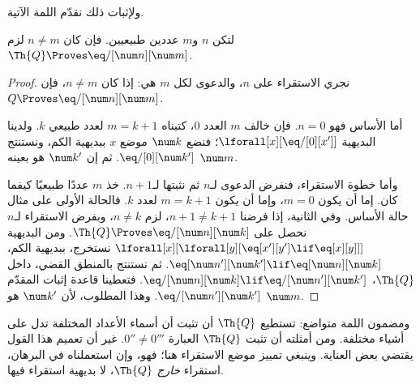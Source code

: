 \documentclass[../../../include/open-logic-section]{subfiles}
\begin{document}
ولإثبات ذلك نقدّم اللمة الآتية.

\begin{lem}
 لتكن $n$ و$m$ عددين طبيعيين.
فإن كان $n\neq m$ لزم $\Th{Q}\Proves\eq/[\num n][\num m]$.
\end{lem}

\begin{proof}
نجري الاستقراء على $n$، والدعوى لكل $m$ هي: إذا كان $n\neq m$،
فإن $Q\Proves\eq/[\num n][\num m]$.

أما الأساس فهو $n=0$. فإن خالف $m$ العدد $0$، كتبناه
$m=k+1$ لعدد طبيعي $k$. ولدينا البديهية
$\lforall[x][\eq/[0][x']]$؛ فنضع $\num k$ موضع $x$ ببديهية الكم،
ونستنتج $\eq/[0][\num k']$. ثم إن $\num k'$ هو بعينه $\num m$.

وأما خطوة الاستقراء، فنفرض الدعوى لـ$n$ ثم نثبتها لـ$n+1$.
خذ $m$ عددًا طبيعيًا كيفما كان. إما أن يكون $m=0$، وإما أن يكون
$m=k+1$ لعدد $k$. فالحالة الأولى على مثال حالة الأساس.
وفي الثانية، إذا فرضنا $n+1\neq k+1$، لزم $n\neq k$،
وبفرض الاستقراء لـ$n$ نحصل على
$\Th{Q}\Proves\eq/[\num n][\num k]$. ومن البديهية
$\lforall[x][\lforall[y][\eq[x'][y']\lif\eq[x][y]]]$
نستخرج، ببديهية الكم،
$\eq[\num n'][\num k']\lif\eq[\num n][\num k]$.
ثم نستنتج بالمنطق القضي، داخل $\Th{Q}$،
$\eq/[\num n][\num k]\lif\eq/[\num n'][\num k']$.
فتعطينا قاعدة إثبات المقدّم $\eq/[\num n'][\num k']$.
وهذا المطلوب، لأن $\num k'$ هو $\num m$.
\end{proof}

\begin{explain}
ومضمون اللمة متواضع: تستطيع $\Th{Q}$ أن تثبت أن أسماء الأعداد المختلفة
تدل على أشياء مختلفة. ومن أمثلته أن تثبت $\Th{Q}$ العبارة
$0''\neq0'''$. غير أن تعميم هذا القول يقتضي بعض العناية.
وينبغي تمييز موضع الاستقراء هنا؛ فهو، وإن استعملناه في البرهان،
استقراء \emph{خارج} $\Th{Q}$، لا بديهية استقراء فيها.
\end{explain}
\end{document}

